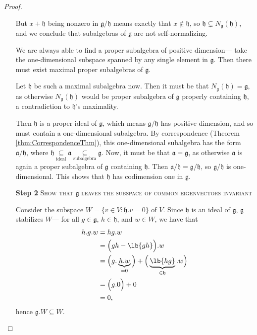 \documentclass{article}
\DeclarePairedDelimiter\lb\lbrack\rbrack
\newcommand*\frka{{\ensuremath{\mathfrak{a}}}}
\newcommand*\frkg{{\ensuremath{\mathfrak{g}}}}
\newcommand*\frkh{{\ensuremath{\mathfrak{h}}}}
\newcommand*\acts{.}
\begin{document}
\begin{proof}
\begin{itemize}
            But $x + \frkh$ being nonzero in $\frkg/\frkh$ means exactly that $x \notin \frkh$, so $\frkh \subsetneq N_\frkg(\frkh)$, and we conclude that subalgebras of $\frkg$ are not self-normalizing.

            We are always able to find a proper subalgebra of positive dimension--- take the one-dimensional subspace spanned by any single element in $\frkg$. 
            Then there must exist maximal proper subalgebras of $\frkg$.

            Let $\frkh$ be such a maximal subalgebra now. 
            Then it must be that $N_\frkg(\frkh) = \frkg$, as otherwise $N_\frkg(\frkh)$ would be proper subalgebra of $\frkg$ properly containing $\frkh$, a contradiction to $\frkh$'s maximality.

            Then $\frkh$ is a proper ideal of $\frkg$, which means $\frkg/\frkh$ has positive dimension, and so must contain a one-dimensional subalgebra.
            By correspondence (Theorem \ref{thm:CorrespondenceThm}), this one-dimensional subalgebra has the form $\frka/\frkh$, where $\frkh \underset{\mathrm{ideal}}{\subseteq} \frka \underset{\mathrm{subalgebra}}{\subseteq} \frkg$.
            Now, it must be that $\frka = \frkg$, as otherwise $\frka$ is again a proper subalgebra of $\frkg$ containing $\frkh$.
            Then $\frka/\frkh = \frkg/\frkh$, so $\frkg/\frkh$ is one-dimensional.
            This shows that $\frkh$ has codimension one in $\frkg$.

        \item[\textbf{Step 2}] 
            \textsc{\color{Crimson} Show that $\frkg$ leaves the subspace of common eigenvectors invariant}

            Consider the subspace $W = \{ v \in V : \frkh \acts v = 0 \}$ of $V$.
            Since $\frkh$ is an ideal of $\frkg$, $\frkg$ stabilizes $W$--- for all $g \in \frkg$, $h \in \frkh$, and $w \in W$, we have that
            \begin{align*}
                h \acts g \acts w
                &=
                hg \acts w
                \\
                &= 
                \Big(gh - \lb{gh}\Big) \acts w
                \\
                &=
                \Big( g \acts \underbrace{h \acts w}_{=0} \Big) + \Big(\underbrace{\lb{hg}}_{\in \frkh} \acts w\Big)
                \\
                &=
                \Big( g \acts 0 \Big) + 0
                \\
                &=
                0,
            \end{align*}
            hence $\frkg \acts W \subseteq W$.


\end{itemize}
\end{proof}
\end{document}
